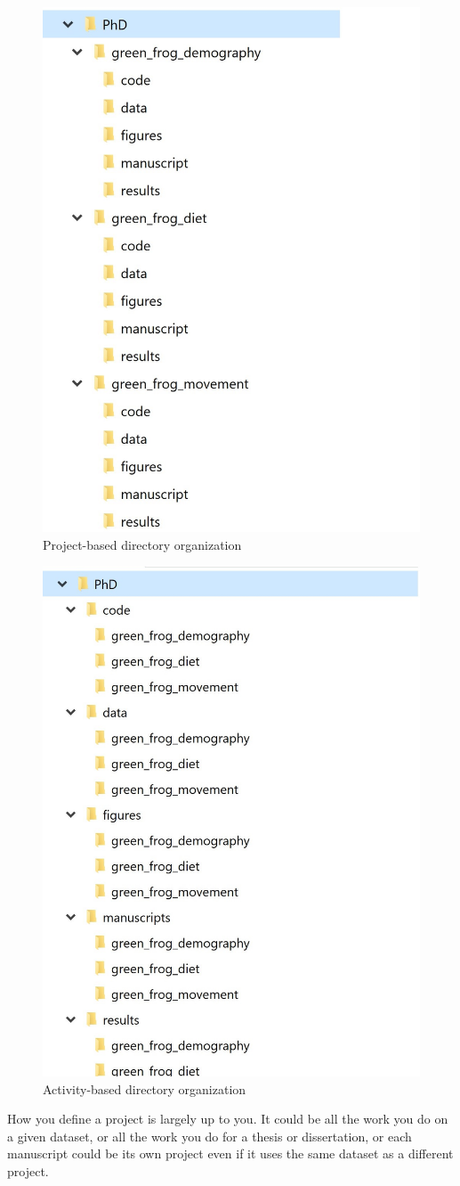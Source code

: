\documentclass[
]{book}
\begin{document}
\begin{figure}

{\centering \includegraphics[width=0.5\linewidth]{img/project-based-directory-organization} 

}

\caption{Project-based directory organization}\label{fig:proj-based}
\end{figure}

\begin{figure}

{\centering \includegraphics[width=0.5\linewidth]{img/activity-based-directory-organization} 

}

\caption{Activity-based directory organization}\label{fig:act-based}
\end{figure}

How you define a project is largely up to you. It could be all the work you do on a given dataset, or all the work you do for a thesis or dissertation, or each manuscript could be its own project even if it uses the same dataset as a different project.
\end{document}
